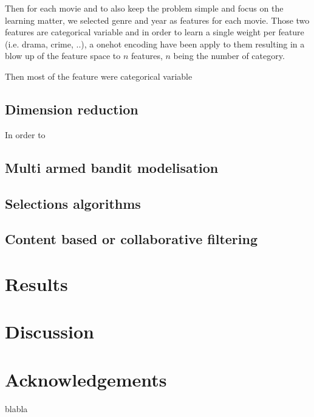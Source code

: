 \documentclass[letterpaper]{article}
\begin{document}
Then for each movie and to also keep the problem simple and focus on the learning matter, we selected genre and year as features for each movie. Those two features are categorical variable and in order to learn a single weight per feature (i.e. drama, crime, ..), a onehot encoding have been apply to them resulting in a blow up of the feature space to $n$ features, $n$ being the number of category.

\begin{table}[h]
\vskip 0.25cm
\caption{Movise feature space}
\end{table}


Then most of the feature were categorical variable


\subsection{Dimension reduction}

In order to 


\subsection{Multi armed bandit modelisation}


\subsection{Selections algorithms}



\subsection{Content based or collaborative filtering}



\section{Results}


\section{Discussion}


\section{Acknowledgements}

blabla

\footnotesize


\end{document}
